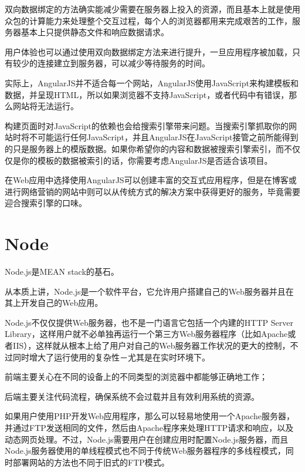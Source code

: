 双向数据绑定的方法确实能减少需要在服务器上投入的资源，而且基本上就是使用众包的计算能力来处理整个交互过程，每个人的浏览器都用来完成艰苦的工作，服务器基本上只提供静态文件和响应数据请求。

用户体验也可以通过使用双向数据绑定方法来进行提升，一旦应用程序被加载，只有较少的连接建立到服务器，可以减少等待服务的时间。

实际上，AngularJS并不适合每一个网站，AngularJS使用JavaScript来构建模板和数据，并呈现HTML，所以如果浏览器不支持JavaScript，或者代码中有错误，那么网站将无法运行。


构建页面时对JavaScript的依赖也会给搜索引擎带来问题。当搜索引擎抓取你的网站时将不可能运行任何JavaScript，并且AngularJS在JavaScript接管之前所能得到的只是服务器上的模版数据。如果你希望你的内容和数据被搜索引擎索引，而不仅仅是你的模板的数据被索引的话，你需要考虑AngularJS是否适合该项目。


在Web应用中选择使用AngularJS可以创建丰富的交互式应用程序，但是在博客或进行网络营销的网站中则可以从传统方式的解决方案中获得更好的服务，毕竟需要迎合搜索引擎的口味。



\section{Node}


Node.js是MEAN stack的基石。

从本质上讲，Node.js是一个软件平台，它允许用户搭建自己的Web服务器并且在其上开发自己的Web应用。

Node.js不仅仅提供Web服务器，也不是一门语言它包括一个内建的HTTP Server Library，这样用户就不必单独再运行一个第三方Web服务器程序（比如Apache或者IIS），这样就从根本上给了用户对自己的Web服务器工作状况的更大的控制，不过同时增大了运行使用的复杂性－尤其是在实时环境下。


\begin{compactitem}
\item 前端主要关心在不同的设备上的不同类型的浏览器中都能够正确地工作；
\item 后端主要关注代码流程，确保系统不会过载并且有效利用系统的资源。
\end{compactitem}


如果用户使用PHP开发Web应用程序，那么可以轻易地使用一个Apache服务器，并通过FTP发送相同的文件，然后由Apache程序来处理HTTP请求和响应，以及动态网页处理。不过，Node.js需要用户在创建应用时配置Node.js服务器，而且Node.js服务器使用的单线程模式也不同于传统Web服务器程序的多线程模式，同时部署网站的方法也不同于旧式的FTP模式。



